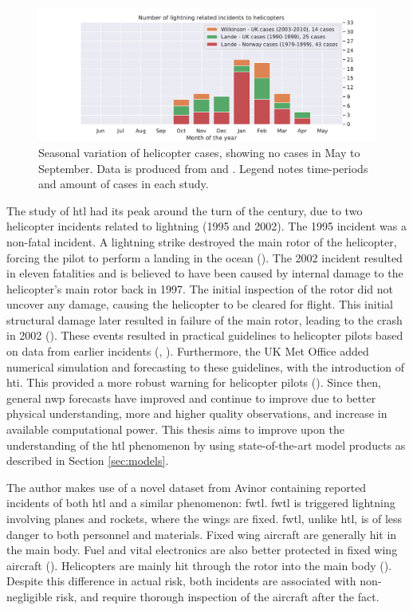 \begin{figure}
    \centering
    \includegraphics[width=\textwidth]{Figures/yearlydistribution_withoutmine.pdf}
    \caption{Seasonal variation of helicopter cases, showing no cases in May to September. Data is produced from \cite{lande1999} and \cite{wilkinson2013}. Legend notes time-periods and amount of cases in each study.}
    \label{fig:landewilk}
\end{figure}

The study of \acrshort{htl} had its peak around the turn of the century, due to two helicopter incidents related to lightning (1995 and 2002). The 1995 incident was a non-fatal incident. A lightning strike destroyed the main rotor of the helicopter, forcing the pilot to perform a landing in the ocean (\cite{smart1997}). The 2002 incident resulted in eleven fatalities and is believed to have been caused by internal damage to the helicopter's main rotor back in 1997. The initial inspection of the rotor did not uncover any damage, causing the helicopter to be cleared for flight. This initial structural damage later resulted in failure of the main rotor, leading to the crash in 2002 (\cite{smart2005}). These events resulted in practical guidelines to helicopter pilots based on data from earlier incidents (\cite{lande1999}, \cite{hardwick1999}). Furthermore, the UK Met Office added numerical simulation and forecasting to these guidelines, with the introduction of \acrfull{hti}. This provided a more robust warning for helicopter pilots (\cite{wilkinson2013}). Since then, general \acrfull{nwp} forecasts have improved and continue to improve due to better  physical understanding, more and higher quality observations, and increase in available computational power. This thesis aims to improve upon the understanding of the \acrshort{htl} phenomenon by using state-of-the-art model products as described in Section \ref{sec:models}.

The author makes use of a novel dataset from Avinor containing reported incidents of both \acrshort{htl} and a similar phenomenon: \acrfull{fwtl}. \acrshort{fwtl} is triggered lightning involving planes and rockets, where the wings are fixed. \acrshort{fwtl}, unlike \acrshort{htl}, is of less danger to both personnel and materials. Fixed wing aircraft are generally hit in the main body. Fuel and vital electronics are also better protected in fixed wing aircraft (\cite{petrov2012}). Helicopters are mainly hit through the rotor into the main body (\cite{lande1999}). Despite this difference in actual risk, both incidents are associated with non-negligible risk, and require thorough inspection of the aircraft after the fact.

